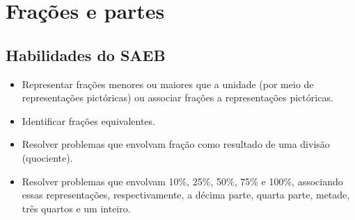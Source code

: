 \chapter{Frações e partes}


\section{Habilidades do SAEB}

\begin{itemize}
\item Representar frações menores ou maiores que a unidade (por meio de
representações pictóricas) ou associar frações a representações pictóricas.

\item Identificar frações equivalentes.

\item Resolver problemas que envolvam fração como resultado de uma divisão
(quociente).

\item Resolver problemas que envolvam 10\%, 25\%, 50\%, 75\% e 100\%,
associando essas representações, respectivamente, a décima parte, quarta parte, metade,
três quartos e um inteiro.
\end{itemize}




